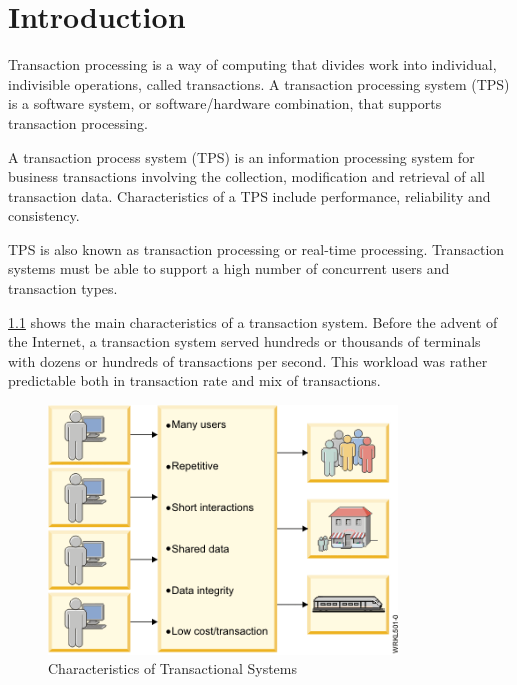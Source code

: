\chapter{Introduction}
Transaction processing is a way of computing that divides work into individual, indivisible operations, called transactions. A transaction processing system (TPS) is a software system, or software/hardware combination, that supports transaction processing.
\par
A transaction process system (TPS) is an information processing system for business transactions involving the collection, modification and retrieval of all transaction data. Characteristics of a TPS include performance, reliability and consistency.
\par
TPS is also known as transaction processing or real-time processing. Transaction systems must be able to support a high number of concurrent users and transaction types.
\par
 \ref{fig:oltp} shows the main characteristics of a transaction system. Before the advent of the Internet, a transaction system served hundreds or thousands of terminals with dozens or hundreds of transactions per second. This workload was rather predictable both in transaction rate and mix of transactions.
 \begin{figure}[ht]
\centering
\includegraphics[width=25em]{figures/figure1.png}
\caption{Characteristics of Transactional Systems}
\label{fig:oltp}
\end{figure}
\par

